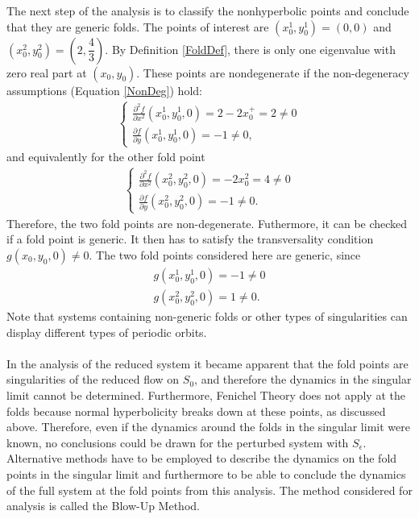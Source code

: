 The next step of the analysis is to classify the nonhyperbolic points and conclude that they are generic folds.
The points of interest are $(x_0^1,y_0^1)=(0,0)$ and $(x_0^2,y_0^2)=\left(2,\dfrac{4}{3}\right)$. By Definition \ref{FoldDef}, there is only one eigenvalue with zero real part at $(x_0,y_0)$.
These points are nondegenerate if the non-degeneracy assumptions (Equation \ref{NonDeg}) hold:
\begin{align*}
\begin{cases}
\frac{ \partial ^2 f}{ \partial x^2} (x_0^1,y_0^1, 0) = 2-2 x_0^+ = 2 \neq 0 \\
\frac{\partial f}{\partial y}(x_0^1,y_0^1, 0) = -1 \neq 0,
\end{cases}
\end{align*}
and equivalently for the other fold point
\begin{align*}
\begin{cases}
\frac{ \partial ^2 f}{ \partial x^2} (x_0^2,y_0^2,0) = -2 x_0^2 =4\neq 0 \\
\frac{\partial f}{\partial y}(x_0^2,y_0^2, 0) = -1 \neq 0.
\end{cases}
\end{align*}
Therefore, the two fold points are non-degenerate.
Futhermore, it can be checked if a fold point is generic. It then has to satisfy the transversality condition $g(x_0,y_0,0) \neq 0$.
The two fold points considered here are generic, since 
\begin{align*}
g(x_0^1,y_0^1,0)= -1\neq 0 \\
g(x_0^2,y_0^2,0)= 1 \neq 0.
\end{align*}
Note that systems containing non-generic folds or other types of singularities can display different types of periodic orbits.
\\
\\
In the analysis of the reduced system it became apparent that the fold points are singularities of the reduced flow on $S_0$, and therefore the dynamics in the singular limit cannot be determined. Furthermore, Fenichel Theory does not apply at the folds because normal hyperbolicity breaks down at these points, as discussed above. Therefore, even if the dynamics around the folds in the singular limit were known, no conclusions could be drawn for the perturbed system with $S_\epsilon$.
Alternative methods have to be employed to describe the dynamics on the fold points in the singular limit and furthermore to be able to conclude the dynamics of the full system at the fold points from this analysis.
The method considered for analysis is called the Blow-Up Method.




